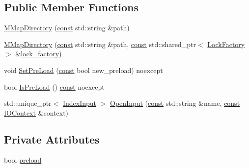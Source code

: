 \subsection*{Public Member Functions}
\begin{DoxyCompactItemize}
\item 
\mbox{\hyperlink{classlucene_1_1core_1_1store_1_1MMapDirectory_a92290f8e78a93ef15e58c8e114fc0fa3}{M\+Map\+Directory}} (\mbox{\hyperlink{ZlibCrc32_8h_a2c212835823e3c54a8ab6d95c652660e}{const}} std\+::string \&path)
\item 
\mbox{\hyperlink{classlucene_1_1core_1_1store_1_1MMapDirectory_a8270d1bc0f9d410c19eac95e8ef8ea48}{M\+Map\+Directory}} (\mbox{\hyperlink{ZlibCrc32_8h_a2c212835823e3c54a8ab6d95c652660e}{const}} std\+::string \&path, \mbox{\hyperlink{ZlibCrc32_8h_a2c212835823e3c54a8ab6d95c652660e}{const}} std\+::shared\+\_\+ptr$<$ \mbox{\hyperlink{classlucene_1_1core_1_1store_1_1LockFactory}{Lock\+Factory}} $>$ \&\mbox{\hyperlink{classlucene_1_1core_1_1store_1_1BaseDirectory_a61e759bb8ca8ec591d2a067679164f3a}{lock\+\_\+factory}})
\item 
void \mbox{\hyperlink{classlucene_1_1core_1_1store_1_1MMapDirectory_a1089bb27f5e5189909bb98835c49965b}{Set\+Pre\+Load}} (\mbox{\hyperlink{ZlibCrc32_8h_a2c212835823e3c54a8ab6d95c652660e}{const}} bool new\+\_\+preload) noexcept
\item 
bool \mbox{\hyperlink{classlucene_1_1core_1_1store_1_1MMapDirectory_af463dc9e012f72c23e7f29899f57464e}{Is\+Pre\+Load}} () \mbox{\hyperlink{ZlibCrc32_8h_a2c212835823e3c54a8ab6d95c652660e}{const}} noexcept
\item 
std\+::unique\+\_\+ptr$<$ \mbox{\hyperlink{classlucene_1_1core_1_1store_1_1IndexInput}{Index\+Input}} $>$ \mbox{\hyperlink{classlucene_1_1core_1_1store_1_1MMapDirectory_ab69c2621677342be11820cb290ac8a4b}{Open\+Input}} (\mbox{\hyperlink{ZlibCrc32_8h_a2c212835823e3c54a8ab6d95c652660e}{const}} std\+::string \&name, \mbox{\hyperlink{ZlibCrc32_8h_a2c212835823e3c54a8ab6d95c652660e}{const}} \mbox{\hyperlink{classlucene_1_1core_1_1store_1_1IOContext}{I\+O\+Context}} \&context)
\end{DoxyCompactItemize}
\subsection*{Private Attributes}
\begin{DoxyCompactItemize}
\item 
bool \mbox{\hyperlink{classlucene_1_1core_1_1store_1_1MMapDirectory_a7bd67252d7136e8185bf3a1cffc8245e}{preload}}
\end{DoxyCompactItemize}

